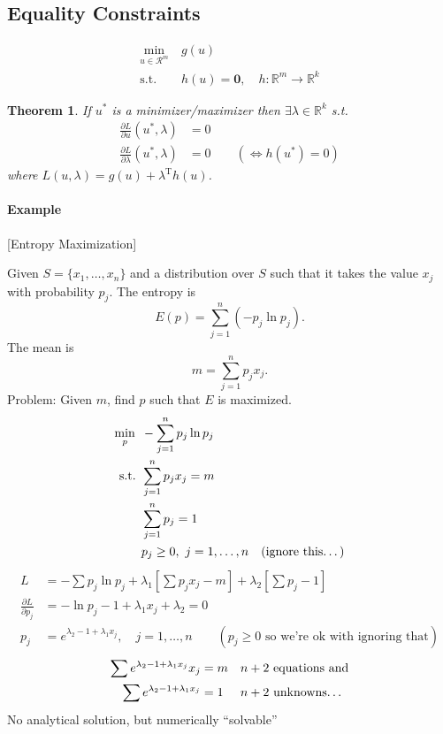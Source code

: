 \documentclass[letterpaper,12pt,titlepage]{report}
\newcommand{\trans}{^\text{T}}
\newcommand*\pder[2]{\frac{\partial #1}{\partial #2}}
\newcommand*\R{\mathbb{R}}
\theoremstyle{plain}
\newtheorem*{thm}{Theorem}
\theoremstyle{definition}
\begin{document}
\subsection{Equality Constraints}
\begin{align}
  \min_{u\in\mathcal R^m} {}\ & g(u) \\
  \text{s.t. } & h(u)=\bm 0, \quad h:\R^m\to\R^k
\end{align}
\begin{thm}
  If $u^*$ is a minimizer/maximizer then $\exists\lambda\in\R^k$ s.t.
  \begin{align}
    \pder{L}{u}(u^*,\lambda) &= 0 \\
    \pder{L}{\lambda}(u^*,\lambda) &= 0 \qquad (\Longleftrightarrow h(u^*)=0)
  \end{align}
  where $L(u,\lambda) = g(u) + \lambda\trans h(u)$.
\end{thm}

\paragraph{Example} [Entropy Maximization]

Given $S=\{x_1,\dots,x_n\}$ and a distribution over $S$ such that it takes the value $x_j$ with probability $p_j$. The entropy is
\[ E(p) = \sum_{j=1}^n (-p_j \ln p_j). \]
The mean is
\[ m = \sum_{j=1}^n p_jx_j. \]
Problem: Given $m$, find $p$ such that $E$ is maximized.
\begin{align}
  \min_{p} {}\ & -\sum_{j=1}^n p_j \ln p_j \\
  \text{s.t. } & \sum_{j=1}^n p_j x_j = m \\
               & \sum_{j=1}^n p_j = 1 \\
               & p_j \ge 0, \ j=1,\dots,n \quad \text{(ignore this\dots)}
\end{align}
\begin{align}
  L &= - \sum p_j \ln p_j + \lambda_1 \left[ \sum p_j x_j -m \right] + \lambda_2 \left[ \sum p_j - 1 \right] \\
  \pder{L}{p_j} &= -\ln p_j - 1 + \lambda_1 x_j + \lambda_2 = 0 \\
  p_j &= e^{\lambda_2 - 1 + \lambda_1 x_j}, \quad j=1,\dots,n \qquad (p_j\ge0 \text{ so we're ok with ignoring that})
\end{align}
\begin{align}
\sum e^{\lambda_2 - 1 + \lambda_1 x_j} x_j &= m && n+2 \text{ equations and} \\
  \sum e^{\lambda_2 - 1 + \lambda_1 x_j} &= 1 && n+2 \text{ unknowns\dots}
\end{align}
No analytical solution, but numerically ``solvable''
\end{document}
